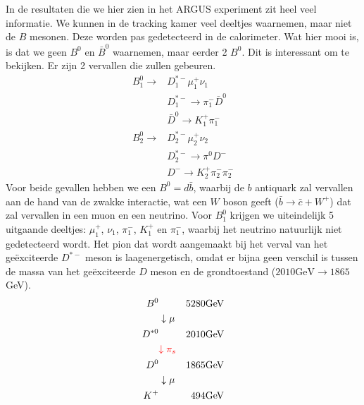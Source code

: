 \documentclass[../main.tex]{subfiles}
\begin{document}
In de resultaten die we hier zien in het ARGUS experiment zit heel veel informatie. We kunnen in de tracking kamer veel deeltjes waarnemen, maar niet de $B$ mesonen. Deze worden pas gedetecteerd in de calorimeter. Wat hier mooi is, is dat we geen $B^0$ en $\bar{B}^0$ waarnemen, maar eerder 2 $B^0$. Dit is interessant om te bekijken. Er zijn 2 vervallen die zullen gebeuren.
\begin{equation}
    \begin{aligned}
        \label{eq:argus_vervallen}
        B_{1}^{0} \rightarrow & D_{1}^{*-} \mu_{1}^{+} \nu_{1} \\
                              & D_{1}^{*-} \rightarrow \pi_{1}^{-} \bar{D}^{0} \\
                              & \bar{D}^{0} \rightarrow K_{1}^{+} \pi_{1}^{-} \\
        B_{2}^{0} \rightarrow & D_{2}^{*-} \mu_{2}^{+} \nu_{2} \\
                              & D_{2}^{*-} \rightarrow \pi^{0} D^{-} \\
                              & D^{-} \rightarrow K_{2}^{+} \pi_{2}^{-} \pi_{2}^{-}
    \end{aligned}
\end{equation}
Voor beide gevallen hebben we een $B^0=d\bar{b}$, waarbij de $b$ antiquark zal vervallen aan de hand van de zwakke interactie, wat een $W$ boson geeft ($\bar{b} \rightarrow \bar{c}+W^{+}$) dat zal vervallen in een muon en een neutrino. Voor $B_1^0$ krijgen we uiteindelijk 5 uitgaande deeltjes: $\mu_1^+$, $\nu_1$, $\pi_1^-$, $K_1^+$ en $\pi_1^-$, waarbij het neutrino natuurlijk niet gedetecteerd wordt. Het pion dat wordt aangemaakt bij het verval van het geëxciteerde $D^{*-}$ meson is laagenergetisch, omdat er bijna geen verschil is tussen de massa van het geëxciteerde $D$ meson en de grondtoestand ($2010\text{GeV}\rightarrow1865$GeV).
\begin{equation}
    \begin{aligned}
        \label{eq:argus_verval_1}
        B^0     &                   & 5280\text{GeV}    \\
                & \downarrow \mu    &                   \\
        D^{*0}  &                   & 2010\text{GeV}    \\
                & {\color{red} \downarrow \pi_s}    &   \\
        D^0     &                   & 1865\text{GeV}    \\
                & \downarrow \mu    &                   \\
        K^+     &                   & 494\text{GeV}     \\
    \end{aligned}
\end{equation}
\end{document}
